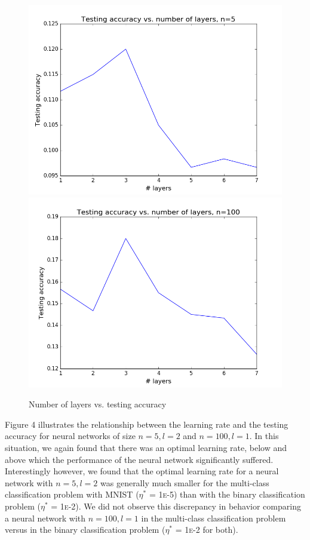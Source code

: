 \documentclass{article}
\begin{document}
\begin{figure}[width=\linewidth]
\centering
\begin{multicols}{2}
  \includegraphics[width=1.2\linewidth]{code/P1/accuracy_vs_layers,mnist,n5.png}
  \includegraphics[width=1.2\linewidth]{code/P1/accuracy_vs_layers,mnist,n100.png}
\end{multicols}
\caption{Number of layers vs. testing accuracy}
\end{figure}

Figure 4 illustrates the relationship between the learning rate and the testing accuracy for neural networks of size $n=5,l=2$ and $n=100,l=1$. In this situation, we again found that there was an optimal learning rate, below and above which the performance of the neural network significantly suffered. Interestingly however, we found that the optimal learning rate for a neural network with $n=5, l=2$ was generally much smaller for the multi-class classification problem with MNIST ($\eta^*$ = 1\textsc{e}-5) than with the binary classification problem ($\eta^*$ = 1\textsc{e}-2). We did not observe this discrepancy in behavior comparing a neural network with $n=100, l=1$ in the multi-class classification problem versus in the binary classification problem ($\eta^*$ = 1\textsc{e}-2 for both).
\end{document}
